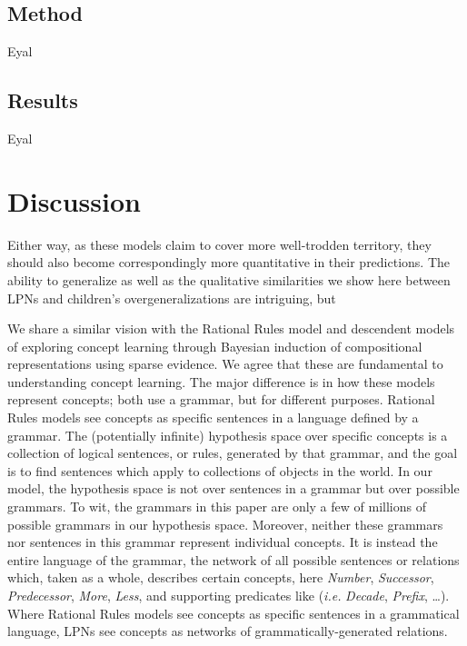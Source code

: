 \documentclass[10pt,letterpaper]{article}
\begin{document}
\subsection{Method}

Eyal

\subsection{Results}

Eyal

\section{Discussion}


Either way, as these models claim to cover more well-trodden
territory, they should also become correspondingly more quantitative
in their predictions. The ability to generalize as well as the
qualitative similarities we show here between LPNs and children's
overgeneralizations are intriguing, but 


We share a similar vision with the Rational Rules model and descendent
models
\citep{goodman2008rational,T.D.Ullman:2012:1b1b6,PianGoodTen2012} of
exploring concept learning through Bayesian induction of compositional
representations using sparse evidence. We agree that these are
fundamental to understanding concept learning. The major difference is
in how these models represent concepts; both use a grammar, but for
different purposes. Rational Rules models see concepts as specific
sentences in a language defined by a grammar. The (potentially
infinite) hypothesis space over specific concepts is a collection of
logical sentences, or rules, generated by that grammar, and the goal
is to find sentences which apply to collections of objects in the
world. In our model, the hypothesis space is not over sentences in a
grammar but over possible grammars. To wit, the grammars in this paper
are only a few of millions of possible grammars in our hypothesis
space. Moreover, neither these grammars nor sentences in this grammar
represent individual concepts. It is instead the entire language of
the grammar, the network of all possible sentences or relations which,
taken as a whole, describes certain concepts, here \emph{Number},
\emph{Successor}, \emph{Predecessor}, \emph{More}, \emph{Less}, and
supporting predicates like ({\it i.e.} \emph{Decade}, \emph{Prefix},
\ldots). Where Rational Rules models see concepts as specific
sentences in a grammatical language, LPNs see concepts as networks of
grammatically-generated relations.
\end{document}
